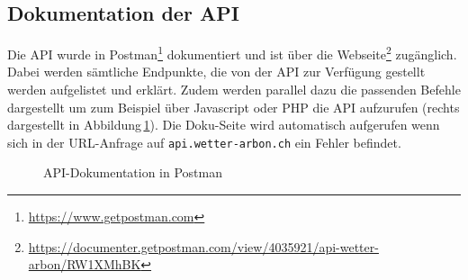 \subsection{Dokumentation der API}
Die API wurde in Postman\footnote{\url{https://www.getpostman.com}} dokumentiert und ist über die Webseite\footnote{\url{https://documenter.getpostman.com/view/4035921/api-wetter-arbon/RW1XMhBK}} zugänglich. Dabei werden sämtliche Endpunkte, die von der API zur Verfügung gestellt werden aufgelistet und erklärt. Zudem werden parallel dazu die passenden Befehle dargestellt um zum Beispiel über Javascript oder PHP die API aufzurufen (rechts dargestellt in Abbildung\,\ref{img:postman}). Die Doku-Seite wird automatisch aufgerufen wenn sich in der URL-Anfrage auf \texttt{api.wetter-arbon.ch} ein Fehler befindet.

\begin{figure}[htbp!]
	\centering
	\caption{API-Dokumentation in Postman}
	\label{img:postman}
\end{figure}



